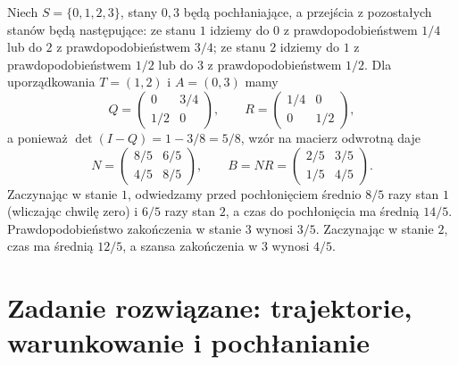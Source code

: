\begin{przyklad}
Niech $S=\{0,1,2,3\}$, stany $0,3$ będą
pochłaniające, a przejścia z pozostałych
stanów będą następujące:
ze stanu $1$ idziemy do $0$ z prawdopodobieństwem
$1/4$ lub do $2$ z prawdopodobieństwem $3/4$;
ze stanu $2$ idziemy do $1$ z prawdopodobieństwem
$1/2$ lub do $3$ z prawdopodobieństwem $1/2$.
Dla uporządkowania $T=(1,2)$ i $A=(0,3)$ mamy
\[
Q=\begin{pmatrix}0&3/4\\1/2&0\end{pmatrix},
\qquad R=\begin{pmatrix}1/4&0\\0&1/2\end{pmatrix},
\]
a ponieważ $\det(I-Q)=1-3/8=5/8$, wzór
na macierz odwrotną daje
\[
N=\begin{pmatrix}8/5&6/5\\4/5&8/5\end{pmatrix},
\qquad B=NR=\begin{pmatrix}2/5&3/5\\1/5&4/5\end{pmatrix}.
\]
Zaczynając w stanie $1$, odwiedzamy przed pochłonięciem średnio
$8/5$ razy stan $1$ (wliczając chwilę zero)
i $6/5$ razy stan $2$,
a czas do pochłonięcia ma średnią $14/5$.
Prawdopodobieństwo zakończenia w stanie $3$
wynosi $3/5$. Zaczynając w stanie $2$, czas
ma średnią $12/5$, a szansa zakończenia w $3$
wynosi $4/5$.
\end{przyklad}


\section{Zadanie rozwiązane: trajektorie, warunkowanie i pochłanianie}

